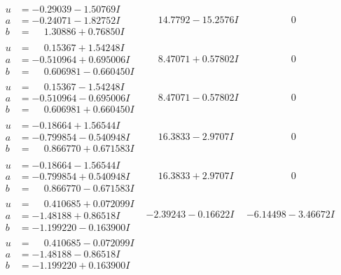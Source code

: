 \documentclass[1p]{elsarticle_modified}
\theoremstyle{definition}
\begin{document}
$$\begin{array}{c|c|c}
\begin{aligned}
u &= -0.29039 - 1.50769 I \\
a &= -0.24071 - 1.82752 I \\
b &= \phantom{-}1.30886 + 0.76850 I\end{aligned}
 & \phantom{-}14.7792 - 15.2576 I & \phantom{-0.000000 } 0 \\ \hline\begin{aligned}
u &= \phantom{-}0.15367 + 1.54248 I \\
a &= -0.510964 + 0.695006 I \\
b &= \phantom{-}0.606981 - 0.660450 I\end{aligned}
 & \phantom{-}8.47071 + 0.57802 I & \phantom{-0.000000 } 0 \\ \hline\begin{aligned}
u &= \phantom{-}0.15367 - 1.54248 I \\
a &= -0.510964 - 0.695006 I \\
b &= \phantom{-}0.606981 + 0.660450 I\end{aligned}
 & \phantom{-}8.47071 - 0.57802 I & \phantom{-0.000000 } 0 \\ \hline\begin{aligned}
u &= -0.18664 + 1.56544 I \\
a &= -0.799854 - 0.540948 I \\
b &= \phantom{-}0.866770 + 0.671583 I\end{aligned}
 & \phantom{-}16.3833 - 2.9707 I & \phantom{-0.000000 } 0 \\ \hline\begin{aligned}
u &= -0.18664 - 1.56544 I \\
a &= -0.799854 + 0.540948 I \\
b &= \phantom{-}0.866770 - 0.671583 I\end{aligned}
 & \phantom{-}16.3833 + 2.9707 I & \phantom{-0.000000 } 0 \\ \hline\begin{aligned}
u &= \phantom{-}0.410685 + 0.072099 I \\
a &= -1.48188 + 0.86518 I \\
b &= -1.199220 - 0.163900 I\end{aligned}
 & -2.39243 - 0.16622 I & -6.14498 - 3.46672 I \\ \hline\begin{aligned}
u &= \phantom{-}0.410685 - 0.072099 I \\
a &= -1.48188 - 0.86518 I \\
b &= -1.199220 + 0.163900 I\end{aligned}

\end{array}$$
\end{document}
